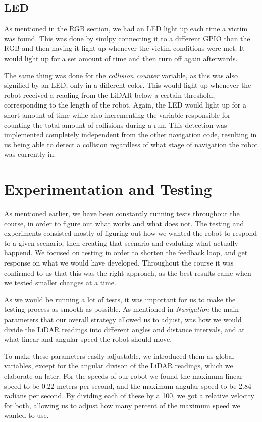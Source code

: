 \documentclass[conference]{IEEEtran}
\begin{document}
\subsection{LED}
As mentioned in the RGB section, we had an LED light up each time a victim was found. This was done by simlpy connecting it to a different GPIO than the RGB and then having it light up whenever the victim conditions were met.
It would light up for a set amount of time and then turn off again afterwards.

The same thing was done for the \textit{collision counter} variable, as this was also signified by an LED, only in a different color.
This would light up whenever the robot received a reading from the LiDAR below a certain threshold, corresponding to the length of the robot.
Again, the LED would light up for a short amount of time while also incrementing the variable responsible for counting the total amount of collisions during a run.
This detection was implemented completely independent from the other navigation code, resulting in us being able to detect a collision regardless of what stage of navigation the robot was currently in.

\section{Experimentation and Testing}
As mentioned earlier, we have been constantly running tests throughout the course, in order to figure out what works and what does not.
The testing and experiments consisted mostly of figuring out how we wanted the robot to respond to a given scenario, then creating that scenario and evaluting what actually happend.
We focused on testing in order to shorten the feedback loop, and get response on what we would have developed.
Throughout the course it was confirmed to us that this was the right approach, as the best results came when we tested smaller changes at a time.

As we would be running a lot of tests, it was important for us to make the testing process as smooth as possible.
As mentioned in \textit{Navigation} the main parameters that our overall strategy allowed us to adjust, was how we would divide the LiDAR readings into different angles and distance intervals, and at what linear and angular speed the robot should move.

To make these parameters easily adjustable, we introduced them as global variables, except for the angular divison of the LiDAR readings, which we elaborate on later.
For the speeds of our robot we found the maximum linear speed to be 0.22 meters per second, and the maximum angular speed to be 2.84 radians per second.
By dividing each of these by a 100, we got a relative velocity for both, allowing us to adjust how many percent of the maximum speed we wanted to use.
\end{document}
